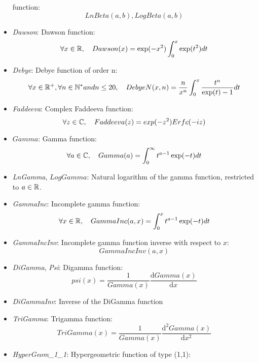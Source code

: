 \begin{itemize}
function:
\begin{equation*}
LnBeta(a,b), LogBeta(a,b)
\end{equation*}
\item \textit{Dawson}: Dawson function:
\begin{equation*}
\forall x \in {\mathbb R},\quad
Dawson(x) = \exp(-x^2)\int_0^x
\exp(t^2) dt
\end{equation*}
\item \textit{Debye}: Debye function of order n:
\begin{equation*}
\forall x \in {\mathbb R}^+, \forall n
\in {\mathbb N}^*and n \leq 20,\quad
DebyeN(x, n) = \frac{n}{x^n}
\int_0^x \frac{t^n}{\exp(t)-1} dt
\end{equation*}
\item \textit{Faddeeva}: Complex Faddeeva function:
\begin{equation*}
\forall z\in {\mathbb C},\quad
Faddeeva(z) =
exp(-z^2)Erfc(-iz)
\end{equation*}
\item $Gamma $: Gamma function:
\begin{equation*}
\forall a \in {\mathbb C},\quad
Gamma(a) = \int_0^{\infty}
t^{a-1}\exp(-t) dt
\end{equation*}
\item \textit{LnGamma}, $LogGamma $: Natural logarithm of the gamma function,
restricted to $a\in{\mathbb R}$.
\item \textit{GammaInc}: Incomplete gamma function:
\begin{equation*}
\forall x \in {\mathbb R},\quad
GammaInc(a, x) =
\int_0^x t^{a-1}\exp(-t) dt
\end{equation*}
\item \textit{GammaIncInv}: Incomplete gamma function inverse with respect
to $x$:
\begin{equation*}
GammaIncInv(a,x)
\end{equation*}
\item \textit{DiGamma}, \textit{Psi}: Digamma function:
\begin{equation*}
psi(x) = \frac{1}{Gamma(x)}\frac{\mathrm{d} Gamma(x)}{\mathrm{d}x}
\end{equation*}
\item \textit{DiGammaInv}: Inverse of the DiGamma function
\item \textit{TriGamma}: Trigamma function:
\begin{equation*}
TriGamma(x) = \frac{1}{Gamma(x)}\frac{\mathrm{d}^2 Gamma(x)}{\mathrm{d}x^2}
\end{equation*}
\item \textit{HyperGeom\_1\_1}: Hypergeometric function of type (1,1):

\end{itemize}
